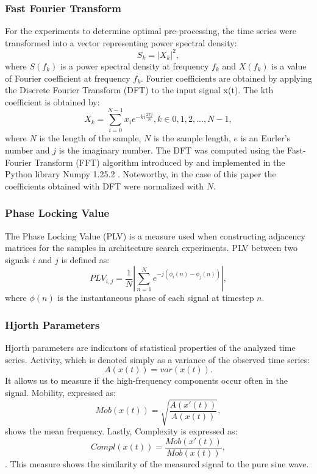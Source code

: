 \documentclass[a4paper,fleqn]{cas-sc}
\begin{document}
\subsubsection{Fast Fourier Transform}
For the experiments to determine optimal pre-processing, the time series were transformed into a vector representing power spectral density:
\begin{equation}
    S_k= |X_k|^{2},
\end{equation}
where $S(f_k)$ is a power spectral density at frequency $f_k$ and $X(f_k)$ is a value of
Fourier coefficient at frequency $f_k$. Fourier coefficients are obtained by applying the Discrete Fourier Transform (DFT) to the input signal x(t). The kth coefficient is obtained by:
\begin{equation}
    X_k = \sum_{i=0}^{N-1}x_i e^{-ki\frac{2\pi j}{N}}, k \in {0,1,2, ..., N-1},
\end{equation}
where $N$ is the length of the sample, $N$ is the sample length, $e$ is an Eurler's number and $j$ is the imaginary number.
The DFT was computed using the Fast-Fourier Transform (FFT) algorithm introduced by \cite{Cooley1965FFT} and
implemented in the Python library Numpy 1.25.2 \cite{harris2020numpy}. Noteworthy, in the case of this paper the coefficients obtained with DFT were normalized with $N$.
\subsubsection{Phase Locking Value}
The Phase Locking Value (PLV) \cite{bruna2018plv} is a measure used when constructing adjacency matrices for the samples in architecture search experiments. PLV between two signals $i$ and $j$ is defined as:
\begin{equation}
    PLV_{i,j} = \frac{1}{N}|\sum_{n=1}^{N}{e^{-j(\phi_i(n)-\phi_j(n))}}|,
\end{equation}
where $\phi(n)$ is the instantaneous phase of each signal at timestep $n$.
\subsubsection{Hjorth Parameters}
Hjorth parameters \cite{hjorth1970params} are indicators of statistical properties of the analyzed time series. Activity, which is denoted simply as a variance of the observed time series:
\begin{equation}
    A(x(t)) = var(x(t)).
\end{equation}
It allows us to measure if the high-frequency components occur often in the signal.
Mobility, expressed as:
\begin{equation}
    Mob(x(t)) = \sqrt{\frac{A(x'(t))}{A(x(t))}},
\end{equation}
shows the mean frequency. Lastly, Complexity is expressed as:
\begin{equation}
    Compl(x(t))=\frac{Mob(x'(t))}{Mob(x(t))},
\end{equation}.
This measure shows the similarity of the measured signal to the pure sine wave.
\end{document}
